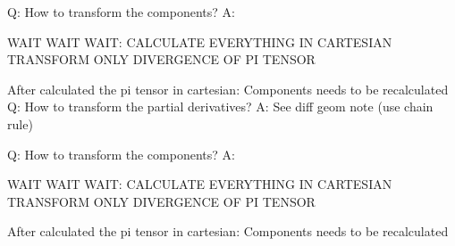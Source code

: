 Q: How to transform the components?
A:


WAIT WAIT WAIT: CALCULATE EVERYTHING IN CARTESIAN
TRANSFORM ONLY DIVERGENCE OF PI TENSOR

After calculated the pi tensor in cartesian: Components needs to be
recalculated
Q: How to transform the partial derivatives?
A: See diff geom note (use chain rule)

Q: How to transform the components?
A:


WAIT WAIT WAIT: CALCULATE EVERYTHING IN CARTESIAN
TRANSFORM ONLY DIVERGENCE OF PI TENSOR

After calculated the pi tensor in cartesian: Components needs to be
recalculated
